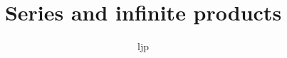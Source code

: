 \documentclass{article}
\title{Series and infinite products}
\author{ljp}
\begin{document}
\maketitle
\tableofcontents

\newpage
\section{}
\end{document}
